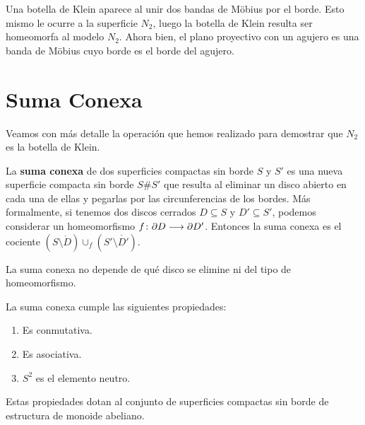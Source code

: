 \documentclass[GTSResumen.tex]{subfiles}
\begin{document}

\begin{ej}\label{klein}

Una botella de Klein aparece al unir dos bandas de Möbius por el borde. Esto mismo le ocurre a la superficie $N_2$, luego la botella de Klein resulta ser homeomorfa al modelo $N_2$. Ahora bien, el plano proyectivo con un agujero es una banda de Möbius cuyo borde es el borde del agujero.





\end{ej}

\section{Suma Conexa}

Veamos con más detalle la operación que hemos realizado para demostrar que $N_2$ es la botella de Klein.

\begin{defi}
La \textbf{suma conexa} de dos superficies compactas sin borde $S$ y $S'$ es una nueva superficie compacta sin borde $S\# S'$ que resulta al eliminar un disco abierto en cada una de ellas y pegarlas por las circunferencias de los bordes. Más formalmente, si tenemos dos discos cerrados $D\subseteq S$ y $D'\subseteq S'$, podemos considerar un homeomorfismo $f\colon{\partial D}\longrightarrow{\partial D'}$. Entonces la suma conexa es el cociente $(S\setminus \mathring{D})\cup_f(S'\setminus \mathring{D'})$.
\end{defi}

\begin{nota} La suma conexa no depende de qué disco se elimine ni del tipo de homeomorfismo.
\end{nota}

\begin{propi} La suma conexa cumple las siguientes propiedades:
\begin{enumerate}
\item Es conmutativa.
\item Es asociativa.
\item $S^2$ es el elemento neutro.
\end{enumerate}
Estas propiedades dotan al conjunto de superficies compactas sin borde de estructura de monoide abeliano.
\end{propi}
\end{document}
